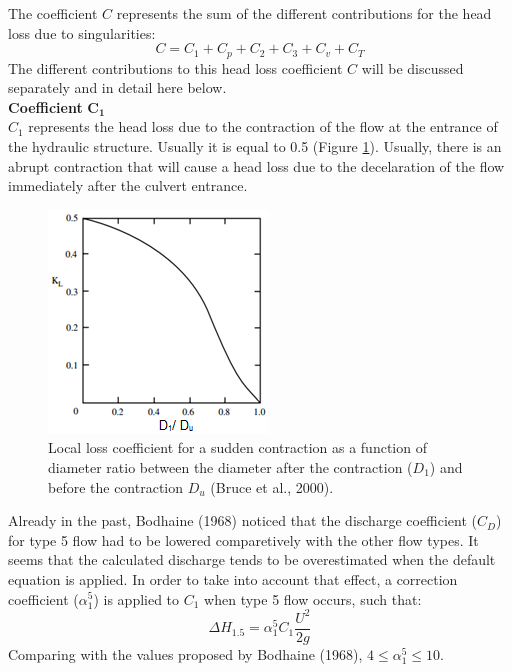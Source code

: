 The coefficient $C$ represents the sum of the different contributions for the
head loss due to singularities:
\begin{equation}
C=C_1+C_p+C_2+C_3+C_v+C_T
\end{equation}
The different contributions to this head loss coefficient $C$ will be discussed
separately and in detail here below.\\

\textbf{Coefficient} $\mathbf{C_1}$ \\
$C_1$ represents the head loss due to the contraction of the flow at the entrance
of the hydraulic structure.
Usually it is equal to 0.5 (Figure \ref{fig:culvert_fig7}).
Usually, there is an abrupt contraction that will cause a head loss due to
the decelaration of the flow immediately after the culvert entrance.

\begin{figure}[H]
\begin{center}
  \includegraphics[scale=1]{culvert_fig7.png}
\end{center}
\caption{Local loss coefficient for a sudden contraction as
a function of diameter ratio between the diameter after the contraction ($D_1$)
and before the contraction $D_u$ (Bruce et al., 2000).}
\label{fig:culvert_fig7}
\end{figure}

Already in the past, Bodhaine (1968) noticed that the discharge coefficient ($C_D$)
for type 5 flow had to be lowered comparetively with the other flow types.
It seems that the calculated discharge tends to be overestimated when the
default equation is applied. In order to take into account that effect,
a correction coefficient ($\alpha_1^5$) is applied to $C_1$ when type 5 flow occurs, such that:
\begin{equation}
\Delta H_{1.5}=\alpha_1^5 C_1  \dfrac{U^2}{2g}
\end{equation}
Comparing with the values proposed by Bodhaine (1968), $4 \le \alpha_1^5 \le 10$.\\

